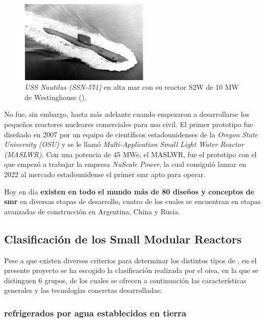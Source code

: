 \begin{figure}[h]
    \centering
    \includegraphics[width=0.55\textwidth]{content/figures/nautilus.jpg}
    \caption{\emph{USS Nautilus (SSN-571)} en alta mar con su reactor S2W de 10 MW de Westinghouse (\cite{poder_naval}).}
    \label{fig:nautilus}
\end{figure}

No fue, sin embargo, hasta más adelante cuando empezaron a desarrollarse los pequeños reactores nucleares comerciales para uso civil. El primer prototipo fue diseñado en 2007 por un equipo de científicos estadounidenses de la \emph{Oregon State University (OSU)} y se le llamó \emph{Multi-Application Small Light Water Reactor (MASLWR)}. Con una potencia de 45 MWe, el MASLWR, fue el prototipo con el que empezó a trabajar la empresa \emph{NuScale Power}, la cual consiguió lanzar en 2022 al mercado estadounidense el primer \acrshort{smr} apto para operar.

Hoy en día \textbf{existen en todo el mundo más de 80 diseños y conceptos de \acrshort{smr}} en diversas etapas de desarrollo, cuatro de los cuales se encuentran en etapas avanzadas de construcción en Argentina, China y Rusia.

\subsection{Clasificación de los Small Modular Reactors}

Pese a que existen diversos criterios para determinar los distintos tipos de , en el presente proyecto se ha escogido la clasificación realizada por el \acrshort{oiea}, en la que se distinguen 6 grupos, de los cuales se ofrecen a continuación las características generales y las tecnologías concretas desarrolladas:

\subsubsection{ refrigerados por agua establecidos en tierra}

